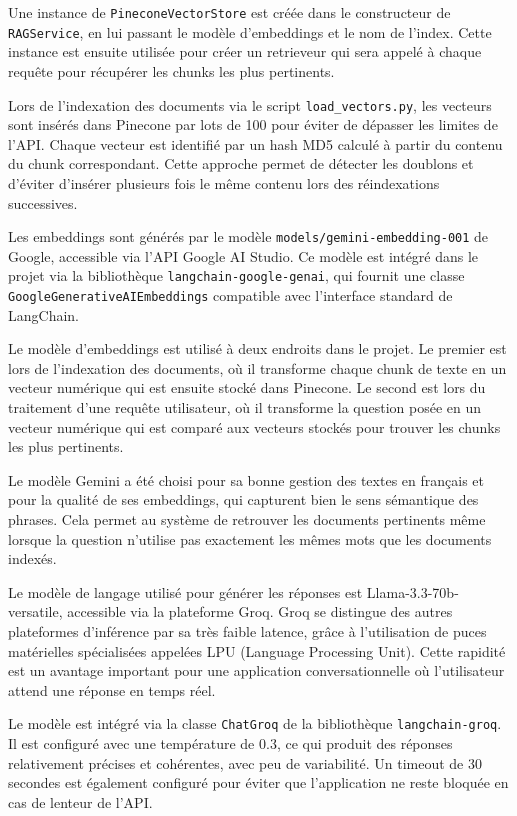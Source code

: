 \documentclass[12pt, a4paper, twoside]{report}
\begin{document}
Une instance de \texttt{PineconeVectorStore} est créée dans le constructeur de \texttt{RAGService}, en lui passant le modèle d'embeddings et le nom de l'index. Cette instance est ensuite utilisée pour créer un retrieveur qui sera appelé à chaque requête pour récupérer les chunks les plus pertinents.

Lors de l'indexation des documents via le script \texttt{load\_vectors.py}, les vecteurs sont insérés dans Pinecone par lots de 100 pour éviter de dépasser les limites de l'API. Chaque vecteur est identifié par un hash MD5 calculé à partir du contenu du chunk correspondant. Cette approche permet de détecter les doublons et d'éviter d'insérer plusieurs fois le même contenu lors des réindexations successives.

Les embeddings sont générés par le modèle \texttt{models/gemini-embedding-001} de Google, accessible via l'API Google AI Studio. Ce modèle est intégré dans le projet via la bibliothèque \texttt{langchain-google-genai}, qui fournit une classe \texttt{GoogleGenerativeAIEmbeddings} compatible avec l'interface standard de LangChain.

Le modèle d'embeddings est utilisé à deux endroits dans le projet. Le premier est lors de l'indexation des documents, où il transforme chaque chunk de texte en un vecteur numérique qui est ensuite stocké dans Pinecone. Le second est lors du traitement d'une requête utilisateur, où il transforme la question posée en un vecteur numérique qui est comparé aux vecteurs stockés pour trouver les chunks les plus pertinents.

Le modèle Gemini a été choisi pour sa bonne gestion des textes en français et pour la qualité de ses embeddings, qui capturent bien le sens sémantique des phrases. Cela permet au système de retrouver les documents pertinents même lorsque la question n'utilise pas exactement les mêmes mots que les documents indexés.

Le modèle de langage utilisé pour générer les réponses est Llama-3.3-70b-versatile, accessible via la plateforme Groq. Groq se distingue des autres plateformes d'inférence par sa très faible latence, grâce à l'utilisation de puces matérielles spécialisées appelées LPU (Language Processing Unit). Cette rapidité est un avantage important pour une application conversationnelle où l'utilisateur attend une réponse en temps réel.

Le modèle est intégré via la classe \texttt{ChatGroq} de la bibliothèque \texttt{langchain-groq}. Il est configuré avec une température de 0.3, ce qui produit des réponses relativement précises et cohérentes, avec peu de variabilité. Un timeout de 30 secondes est également configuré pour éviter que l'application ne reste bloquée en cas de lenteur de l'API.
\end{document}
